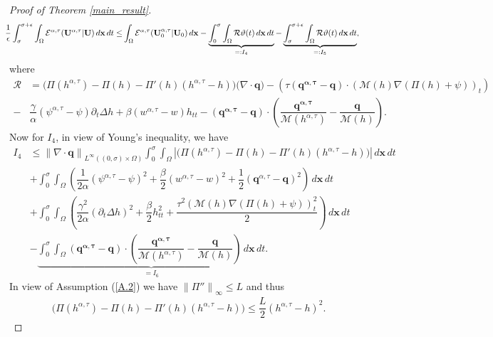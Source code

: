 \documentclass[11pt]{article}
\numberwithin{equation}{section}
\newtheorem{counter example}[theorem]{Counter Example}
\numberwithin{equation}{section}
\numberwithin{equation}{section}
\newcommand{\rel}{^{\alpha, \tau}}
\begin{document}
\begin{proof}[Proof of Theorem \ref{main_result}]
\begin{equation}
\begin{aligned}
    \hspace*{-0.2cm}\dfrac{1}{\epsilon}\int_{\sigma}^{\sigma+\epsilon}\int_{\Omega} \mathcal{E}^{\alpha, \tau}(\mathbf{U}\rel| {\mathbf U})\, d\mathbf{x}\, dt\leq&\int_{\Omega} \mathcal{E}^{\alpha, \tau}(\mathbf{U}_0\rel| {\mathbf U}_0)\, d\mathbf{x}-\underbrace{\int_{0}^{\sigma}\int_{\Omega}\mathcal{R}\vartheta(t)\, d\mathbf{x}\, dt}_{=:I_4}-\underbrace{\int_{\sigma}^{\sigma+\epsilon}\int_{\Omega}\mathcal{R}\vartheta(t)\, d\mathbf{x}\, dt}_{=:I_5},
\end{aligned}
\end{equation}
where
\begin{align}\label{reamainder_R}
\mathcal{R}&=\big(\Pi(h\rel)-\Pi({h})-\Pi'({h})(h\rel-{h})\big)
     \big(\nabla\cdot \mathbf{q}\big)-\left(\tau (\mathbf{q\rel-{q}})\cdot \left(\mathcal{M}({h})\nabla(\Pi({h})+{\psi})\right)_t\right)\nonumber\\
     -&\dfrac{\gamma}{\alpha} (\psi\rel-{\psi})\partial_t\Delta{h}+\beta (w\rel-{w}){h}_{tt}-(\mathbf{q\rel-{q}})\cdot \left(\dfrac{\mathbf{{q\rel}}}{\mathcal{M}(h\rel)}-\dfrac{\mathbf{{q}}}{\mathcal{M}({h})}\right).
\end{align}     
Now for $I_4$, in view of Young's inequality, we have
\begin{equation}\label{I_4}
\begin{aligned}
    I_4&\leq {\lVert \nabla\cdot \mathbf{q}\rVert}_{L^{\infty}((0, \sigma)\times \Omega)} \int_{0}^{\sigma}\int_{\Omega}\left|\big(\Pi(h\rel)-\Pi({h})-\Pi'({h})(h\rel-{h})\big)\right|\, d\mathbf{x}\,dt\\
&+\int_{0}^{\sigma}\int_{\Omega}\left(\dfrac{1}{2\alpha}(\psi\rel-{\psi})^2+\dfrac{\beta}{2} (w\rel-{w})^2+\dfrac{1}{2} (\mathbf{q}\rel-{\mathbf{q}})^2\right)\,d\mathbf{x}\,dt\\
&+\int_{0}^{\sigma}\int_{\Omega}\left(\dfrac{\gamma^2}{2\alpha}(\partial_t\Delta{h})^2+\dfrac{\beta}{2} {h}_{tt}^2+ \dfrac{\tau^2 \left(\mathcal{M}({h})\nabla(\Pi({h})+{\psi})\right)_t^2}{2}\right)\,d\mathbf{x}\,dt\\
&-\underbrace{\int_{0}^{\sigma}\int_{\Omega}(\mathbf{q\rel-{q}})\cdot \left(\dfrac{\mathbf{{q\rel}}}{\mathcal{M}(h\rel)}-\dfrac{\mathbf{{q}}}{\mathcal{M}({h})}\right)\, d\mathbf{x}\, dt}_{=I_6}.
\end{aligned}
\end{equation}
In view of Assumption (\ref{A.2}) we have ${\lVert \Pi''\rVert}_{\infty}\leq L$ and thus
\begin{align}\label{eq: taylor_f}
\big(\Pi(h\rel)-\Pi({h})-\Pi'({h})(h\rel-{h})\big)\leq \dfrac{L}{2}(h\rel-{h})^2.

\end{align}
\end{proof}
\end{document}
